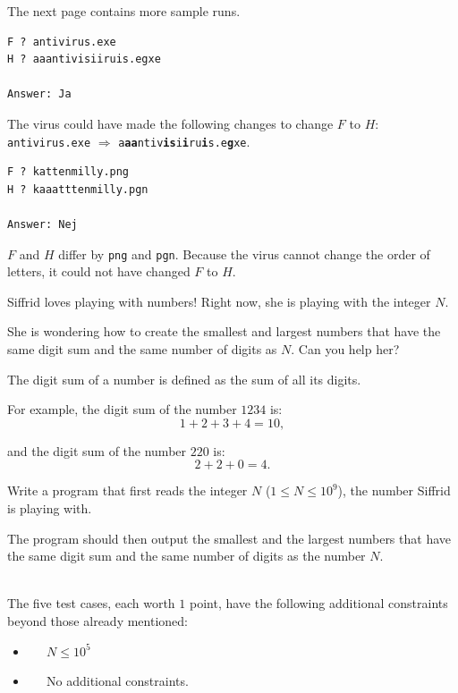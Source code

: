 The next page contains more sample runs.

\newpage

\begin{verbatim}
F ? antivirus.exe
H ? aaantivisiiruis.egxe

Answer: Ja
\end{verbatim}
 The virus could have made the following changes to change $F$ to $H$: \\
\texttt{antivirus.exe} $\Rightarrow$ \texttt{a\textbf{aa}ntiv\textbf{is}i\textbf{i}ru\textbf{i}s.e\textbf{g}xe}.

\begin{verbatim}
F ? kattenmilly.png
H ? kaaatttenmilly.pgn

Answer: Nej
\end{verbatim}
 $F$ and $H$ differ by \texttt{png} and \texttt{pgn}. Because the virus cannot change the order
of letters, it could not have changed $F$ to $H$. 



\newpage
{}

Siffrid loves playing with numbers! Right now, she is playing with the integer $N$.  

She is wondering how to create the smallest and largest numbers that have the same 
digit sum and the same number of digits as $N$.  
Can you help her?  

The digit sum of a number is defined as the sum of all its digits.  

For example, the digit sum of the number $1234$ is:  
$$
1 + 2 + 3 + 4 = 10,
$$  

and the digit sum of the number $220$ is:  
$$
2 + 2 + 0 = 4.
$$  

Write a program that first reads the integer $N$ ($1 \leq N \leq 10^9$), the number Siffrid is playing with.  

The program should then output the smallest and the largest numbers that have the same digit sum 
and the same number of digits as the number $N$.  

\vspace{0.5cm}  
\\  
The five test cases, each worth $1$ point, have the following additional constraints beyond those already mentioned:  

\begin{itemize}
    \item[(1-2)] $\;\;\;\;$ $N \leq 10^5$    
    \item[(3-5)] $\;\;\;\;$ No additional constraints.
\end{itemize}

